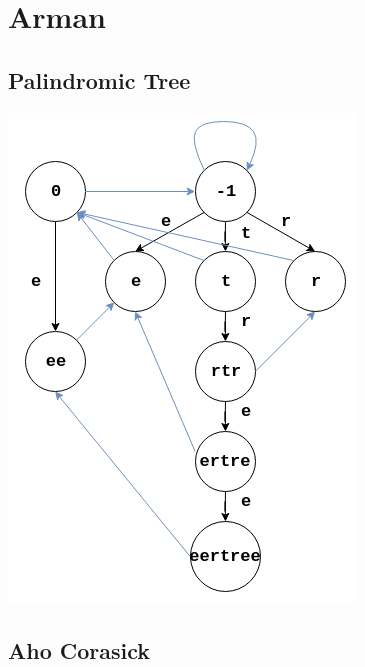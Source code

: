 \chapter{Arman}



\section{Palindromic Tree}

    \includegraphics[scale=0.3]{content/arman/EERTREE.png}


\section{Aho Corasick}
